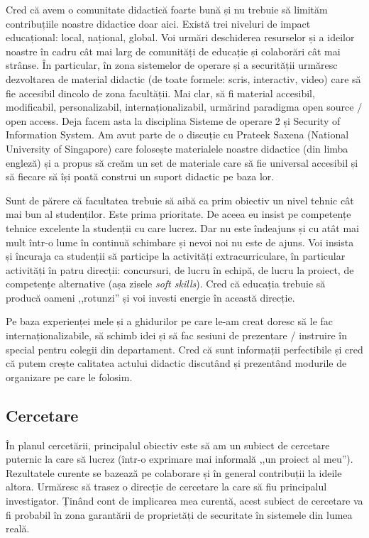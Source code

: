 \documentclass[11pt,a4paper]{article}
\begin{document}
Cred că avem o comunitate didactică foarte bună și nu trebuie să limităm contribuțiile noastre didactice doar aici. Există trei niveluri de impact educațional: local, național, global. Voi urmări deschiderea resurselor și a ideilor noastre în cadru cât mai larg de comunități de educație și colaborări cât mai strânse. În particular, în zona sistemelor de operare și a securității urmăresc dezvoltarea de material didactic (de toate formele: scris, interactiv, video) care să fie accesibil dincolo de zona facultății. Mai clar, să fi material accesibil, modificabil, personalizabil, internaționalizabil, urmărind paradigma open source / open access. Deja facem asta la disciplina Sisteme de operare 2 și Security of Information System. Am avut parte de o discuție cu Prateek Saxena (National University of Singapore) care folosește materialele noastre didactice (din limba engleză) și a propus să creăm un set de materiale care să fie universal accesibil și să fiecare să își poată construi un suport didactic pe baza lor.

Sunt de părere că facultatea trebuie să aibă ca prim obiectiv un nivel tehnic cât mai bun al studenților. Este prima prioritate. De aceea eu insist pe competențe tehnice excelente la studenții cu care lucrez. Dar nu este îndeajuns și cu atât mai mult într-o lume în continuă schimbare și nevoi noi nu este de ajuns. Voi insista și încuraja ca studenții să participe la activități extracurriculare, în particular activități în patru direcții: concursuri, de lucru în echipă, de lucru la proiect, de competențe alternative (așa zisele \textit{soft skills}). Cred că educația trebuie să producă oameni ,,rotunzi'' și voi investi energie în această direcție.

Pe baza experienței mele și a ghidurilor pe care le-am creat doresc să le fac internaționalizabile, să schimb idei și să fac sesiuni de prezentare / instruire în special pentru colegii din departament. Cred că sunt informații perfectibile și cred că putem crește calitatea actului didactic discutând și prezentând modurile de organizare pe care le folosim.

\subsection*{Cercetare}

În planul cercetării, principalul obiectiv este să am un subiect de cercetare puternic la care să lucrez (într-o exprimare mai informală ,,un proiect al meu''). Rezultatele curente se bazează pe colaborare și în general contribuții la ideile altora. Urmăresc să trasez o direcție de cercetare la care să fiu principalul investigator. Ținând cont de implicarea mea curentă, acest subiect de cercetare va fi probabil în zona garantării de proprietăți de securitate în sistemele din lumea reală.
\end{document}

